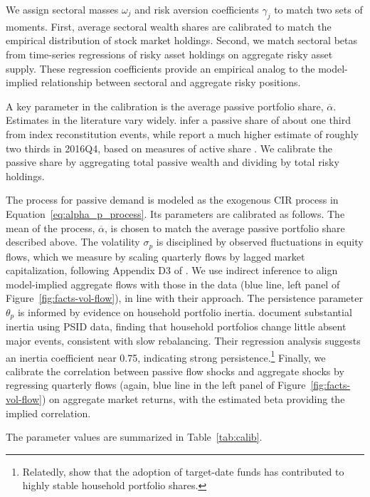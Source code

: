 We assign sectoral masses $\omega_j$ and risk aversion coefficients $\gamma_j$ to match two sets of moments. First, average sectoral wealth shares are calibrated to match the empirical distribution of stock market holdings. Second, we match sectoral betas from time-series regressions of risky asset holdings on aggregate risky asset supply. These regression coefficients provide an empirical analog to the model-implied relationship between sectoral and aggregate risky positions.  

A key parameter in the calibration is the average passive portfolio share, $\overline{\alpha}$. Estimates in the literature vary widely. \citet{chinco2024passive} infer a passive share of about one third from index reconstitution events, while \citet{koijen2024investors} report a much higher estimate of roughly two thirds in 2016Q4, based on measures of active share \citep{cremers2009active}. We calibrate the passive share by aggregating total passive wealth and dividing by total risky holdings.  

The process for passive demand is modeled as the exogenous CIR process in Equation~\eqref{eq:alpha_p_process}. Its parameters are calibrated as follows. The mean of the process, $\overline{\alpha}$, is chosen to match the average passive portfolio share described above. The volatility $\sigma_p$ is disciplined by observed fluctuations in equity flows, which we measure by scaling quarterly flows by lagged market capitalization, following Appendix D3 of \citet{gabaix2020search}. We use indirect inference to align model-implied aggregate flows with those in the data (blue line, left panel of Figure~\ref{fig:facts-vol-flow}), in line with their approach. The persistence parameter $\theta_p$ is informed by evidence on household portfolio inertia. \citet{brunnermeier2008wealth} document substantial inertia using PSID data, finding that household portfolios change little absent major events, consistent with slow rebalancing. Their regression analysis suggests an inertia coefficient near 0.75, indicating strong persistence.\footnote{Relatedly, \citet{parker2023retail} show that the adoption of target-date funds has contributed to highly stable household portfolio shares.} Finally, we calibrate the correlation between passive flow shocks and aggregate shocks by regressing quarterly flows (again, blue line in the left panel of Figure~\ref{fig:facts-vol-flow}) on aggregate market returns, with the estimated beta providing the implied correlation.  

The parameter values are summarized in Table~\ref{tab:calib}.  

